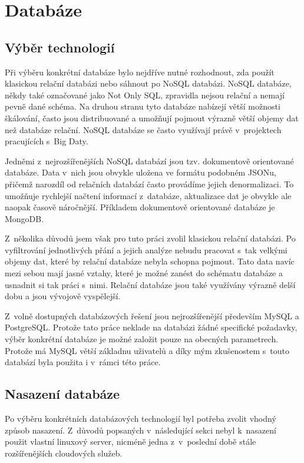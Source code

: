 \documentclass[thesis=B,czech]{FITthesis}[2012/06/26]
\begin{document}
\section{Databáze}
\subsection{Výběr technologií}
	Při výběru konkrétní databáze bylo nejdříve nutné rozhodnout, zda použít klasickou relační databázi nebo sáhnout po NoSQL databázi. NoSQL databáze, někdy také označované jako Not Only SQL, zpravidla nejsou relační a nemají pevně dané schéma. Na druhou stranu tyto databáze nabízejí větší možnosti škálování, často jsou distribuované a umožňují pojmout výrazně větší objemy dat než databáze relační\cite{nosql-dbs}. NoSQL databáze se často využívají právě v~projektech pracujících s~Big Daty. 
	
	Jedněmi z~nejrozšířenějších NoSQL databází jsou tzv. dokumentově orientované databáze. Data v~nich jsou obvykle uložena ve formátu podobném JSONu, přičemž narozdíl od relačních databází často provádíme jejich denormalizaci. To umožňuje rychlejší načtení informací z~databáze, aktualizace dat je obvykle ale naopak časově náročnější\cite{nosql-speed}. Příkladem dokumentově orientované databáze je MongoDB\cite{mongo}. 
	
	Z~několika důvodů jsem však pro tuto práci zvolil klasickou relační databázi. Po vyfiltrování jednotlivých přání a jejich analýze nebudu pracovat s~tak velkými objemy dat, které by relační databáze nebyla schopna pojmout. Tato data navíc mezi sebou mají jasné vztahy, které je možné zanést do schématu databáze a usnadnit si tak práci s~nimi. Relační databáze jsou také využívány výrazně delší dobu a jsou vývojově vyspělejší. 
	
	Z~volně dostupných databázových řešení jsou nejrozšířenější především MySQL a PostgreSQL. Protože tato práce neklade na databázi žádné specifické požadavky, výběr konkrétní databáze je možné založit pouze na obecných parametrech. Protože má MySQL větší základnu uživatelů a díky mým zkušenostem s~touto databází byla použita i v~rámci této práce. 
	
\subsection{Nasazení databáze}
	Po výběru konkrétních databázových technologií byl potřeba zvolit vhodný způsob nasazení. Z~důvodů popsaných v~následující sekci nebyl k~nasazení použit vlastní linuxový server, nicméně jedna z~v~poslední době stále rozšířenějších cloudových služeb. 
	
\end{document}
